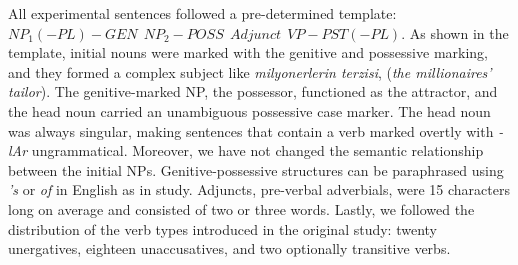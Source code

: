 \ea \label{ex:exp1items}
    \z
\z

All experimental sentences followed a pre-determined template: $NP_1(-PL)-GEN{\ }{\ }NP_2-POSS{\ }{\ }Adjunct{\ }{\ }VP-PST(-PL)$. As shown in the template, initial nouns were marked with the genitive and possessive marking, and they formed a complex subject like \textit{milyonerlerin terzisi}, (\textit{the millionaires' tailor}). The genitive-marked NP, the possessor, functioned as the attractor, and the head noun carried an unambiguous possessive case marker. The head noun was always singular, making sentences that contain a verb marked overtly with \textit{-lAr} ungrammatical. Moreover, we have not changed the semantic relationship between the initial NPs. Genitive-possessive structures can be paraphrased using \textit{'s} or \textit{of} in English as in \cites{LagoEtAl2019} study. Adjuncts, pre-verbal adverbials, were 15 characters long on average and consisted of two or three words. Lastly, we followed the distribution of the verb types introduced in the original study: twenty unergatives, eighteen unaccusatives, and two optionally transitive verbs. 


